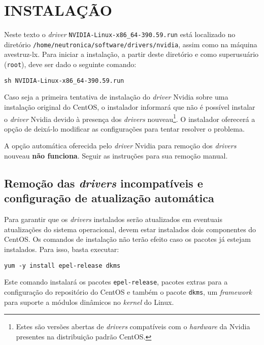 \documentclass[twoside,a4paper,12pt,english]{inac17}
\begin{document}
\section{INSTALAÇÃO}\label{inst}

Neste texto o \textit{driver} \texttt{NVIDIA-Linux-x86\_64-390.59.run} está localizado no diretório \texttt{/home/neutronica/software/drivers/nvidia}, assim 
como na máquina avestruz-lx. Para iniciar a instalação, a partir 
deste diretório e como superusuário (\texttt{root}), deve ser dado o 
seguinte comando:

\texttt{sh NVIDIA-Linux-x86\_64-390.59.run}

Caso seja a primeira tentativa de instalação do \textit{driver} Nvidia sobre uma 
instalação original do CentOS, o instalador informará que não é possível instalar 
o \textit{driver} Nvidia devido à presença dos \textit{drivers} nouveau\footnote{Estes são versões abertas de \textit{drivers} compatíveis com o \textit{hardware} da Nvidia presentes na distribuição padrão CentOS.}. O instalador 
oferecerá a opção de deixá-lo modificar as configurações para tentar resolver 
o problema. 

\begin{shadedbox}
A opção automática oferecida pelo \textit{driver} Nvidia para remoção dos 
\textit{drivers} nouveau \textbf{não funciona}. Seguir as instruções para sua 
remoção manual.
\end{shadedbox}

\subsection{Remoção das \textit{drivers} incompatíveis e configuração de 
atualização automática}

Para garantir que os \textit{drivers} instalados serão atualizados em eventuais 
atualizações do sistema operacional, devem estar instalados dois componentes do 
CentOS. Os comandos de instalação não terão efeito caso os pacotes já estejam 
instalados. Para isso, basta executar:

\texttt{yum -y install epel-release dkms}

Este comando instalará os pacotes \texttt{epel-release}, pacotes extras para 
a configuração do repositório do CentOS e também o pacote \texttt{dkms}, um 
\textit{framework} para suporte a módulos dinâmicos no \textit{kernel} do Linux.
\end{document}
